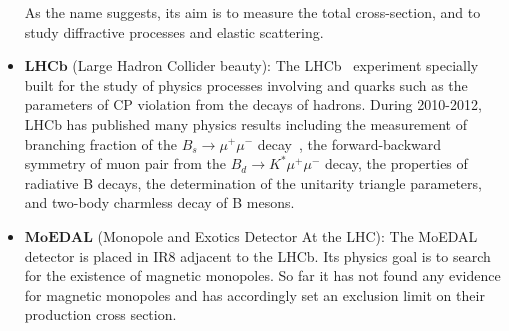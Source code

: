 \begin{itemize}[leftmargin=*]
	As the name suggests, its aim is to measure the total cross-section, and to study 
	diffractive processes and elastic scattering.
\item $\textbf{LHCb}$ (Large Hadron Collider beauty): The 
	LHCb~\cite{Collaboration_2008_LHCb} experiment specially built 
	for the study of physics processes involving \PQb and \PQc quarks such as the parameters of
	CP violation from the decays of \PQb hadrons. During 2010-2012,
	LHCb has published many physics results including the measurement of branching
	fraction of the $B_{s} \rightarrow \mu^+ \mu^-$ decay~\cite{Aaij:2012nna}, the 
	forward-backward symmetry of muon pair from the $B_{d} \rightarrow K^* \mu^+ \mu^-$ decay, 
	the properties of radiative B decays, the determination of the unitarity
	triangle parameters, and two-body charmless decay of B mesons.
\item $\textbf{MoEDAL}$ (Monopole and Exotics Detector At the LHC): 
	The MoEDAL~\cite{Acharya:2014nyr} 
	detector is placed in IR8 adjacent to the LHCb. Its physics goal 
	is to search for the existence of magnetic monopoles. So far it has not found any 
	evidence for magnetic monopoles and has accordingly set an exclusion limit on 
	their production cross section.
\end{itemize}
